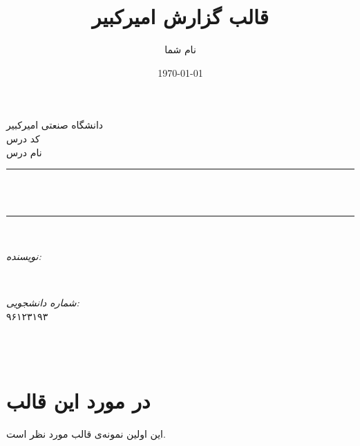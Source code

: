 \documentclass[12pt]{article}
\title{قالب گزارش امیرکبیر}                             %
\author{نام شما}                               %
\date{\today}                                           %
\makeatletter
\let\thetitle\@title
\let\theauthor\@author
\let\thedate\@date
\makeatother
\begin{document}

\begin{titlepage}
    \centering
    \vspace*{0.5 cm}
    \textsc{\LARGE دانشگاه صنعتی امیرکبیر}\\[2.0 cm]   %
    \textsc{\Large کد درس}\\[0.5 cm]               %
    \textsc{\large نام درس}\\[0.5 cm]               %
    \rule{\linewidth}{0.2 mm} \\[0.4 cm]
    { \huge \bfseries \thetitle}\\
    \rule{\linewidth}{0.2 mm} \\[1.5 cm]
    
    \begin{minipage}{0.4\textwidth}
        \begin{flushright} \large
            \emph{نویسنده:}\\
            \theauthor
        \end{flushright}
    \end{minipage}~
    \begin{minipage}{0.4\textwidth}
        \begin{flushleft} \large
            \emph{شماره دانشجویی:} \\
            ۹۶۱۲۳۱۹۳                                   %
        \end{flushleft}
    \end{minipage}\\[2 cm]
    
    {\large \thedate}\\[2 cm]
 
    \vfill
    
\end{titlepage}


\tableofcontents
\pagebreak


\section{در مورد این قالب}
این اولین نمونه‌ی قالب مورد نظر است.
\newpage


\end{document}
